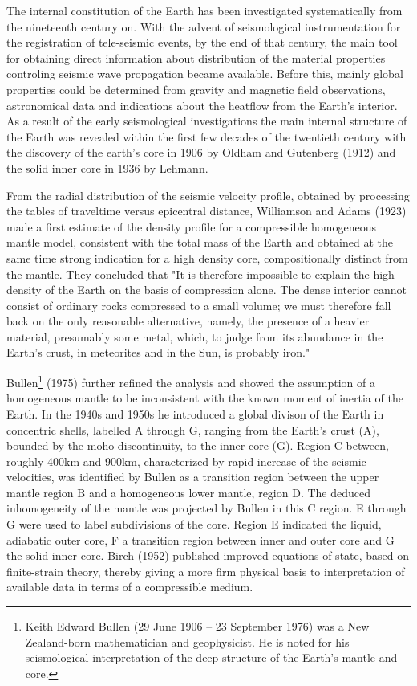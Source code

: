 The internal constitution of the Earth has been investigated 
systematically from the nineteenth century on.
With the advent of seismological instrumentation for
the registration of tele-seismic events,
by the end of that century, the main tool for
obtaining direct information about distribution of the material 
properties controling seismic wave propagation became available.
Before this, mainly global properties could be determined from
gravity and magnetic field observations, astronomical data and 
indications about the heatflow from the Earth's interior.
As a result of the early seismological investigations the
main internal structure of the Earth was revealed within the 
first few decades of the twentieth century with the discovery of the
earth's core in 1906 by Oldham and Gutenberg (1912) and the solid 
inner core in 1936 by Lehmann. 

From the radial distribution of the seismic velocity profile, 
obtained by processing the tables of 
traveltime versus epicentral distance, Williamson and Adams (1923) \cite{wiad23}
made a first estimate of the density profile for a compressible
homogeneous mantle model,
consistent with the total mass of the Earth
and obtained at the same time strong indication 
for a high density core, compositionally distinct from the mantle.
They concluded that "It is therefore impossible to explain the high density of the Earth 
on the basis of compression alone. The dense interior cannot consist of ordinary rocks 
compressed to a small volume; we must therefore fall back on the only reasonable alternative, 
namely, the presence of a heavier material, presumably some metal, which, 
to judge from its abundance in the Earth's crust, in meteorites and in the Sun, is probably iron."
 
Bullen\footnote{Keith Edward Bullen (29 June 1906 – 23 September 1976) was a 
New Zealand-born mathematician and geophysicist. He is noted for his seismological interpretation of 
the deep structure of the Earth's mantle and core.} (1975) \cite{bull75} 
further refined the analysis and showed the assumption 
of a homogeneous mantle to be inconsistent with the known moment of 
inertia of the Earth.
In the 1940s and 1950s he introduced a global divison of the
Earth in concentric shells, labelled A through G, ranging from the
Earth's crust (A), bounded by the moho discontinuity, 
to the inner core (G).
Region C between, roughly 400\si{\kilo\metre} and 900\si{\kilo\metre}, 
characterized by rapid 
increase of the seismic velocities, was identified by Bullen as
a transition region between the upper mantle region B and a
homogeneous lower mantle, region D.
The deduced inhomogeneity of the mantle was projected by Bullen in this
C region. 
E through G were used to label subdivisions of the core.
Region E indicated the liquid, adiabatic outer core,
F a transition region between inner and outer core and G the solid
inner core.
Birch (1952) \cite{birc52} published improved equations of state,
based on finite-strain theory,
thereby giving a more firm physical basis to interpretation of 
available data in terms of a compressible medium.
  
